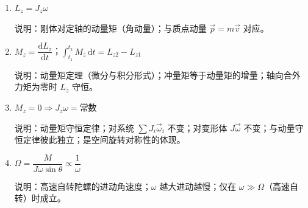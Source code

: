 \documentclass[12pt,a4paper]{ctexart}
\begin{document}
\begin{enumerate}[leftmargin=3em,label=\textbf{公式\arabic*}：,ref=公式\arabic*]
    说明：转动动能定理；与平动动能定理 $A=\frac{1}{2}mv_2^2-\frac{1}{2}mv_1^2$ 对应。

    \item $L_z = J_z\omega$

    说明：刚体对定轴的动量矩（角动量）；与质点动量 $\vec{p}=m\vec{v}$ 对应。

    \item $M_z = \dfrac{\mathrm{d}L_z}{\mathrm{d}t}$；$\displaystyle\int_{t_1}^{t_2} M_z\,\mathrm{d}t = L_{z2}-L_{z1}$

    说明：动量矩定理（微分与积分形式）；冲量矩等于动量矩的增量；轴向合外力矩为零时 $L_z$ 守恒。

    \item $M_z=0 \Rightarrow J_z\omega = \text{常数}$

    说明：动量矩守恒定律；对系统 $\sum J_i\vec{\omega}_i$ 不变；对变形体 $J\vec{\omega}$ 不变；与动量守恒定律彼此独立；是空间旋转对称性的体现。

    \item $\Omega = \dfrac{M}{J\omega\sin\theta}\propto\dfrac{1}{\omega}$

    说明：高速自转陀螺的进动角速度；$\omega$ 越大进动越慢；仅在 $\omega\gg\Omega$（高速自转）时成立。

\end{enumerate}
\end{document}
